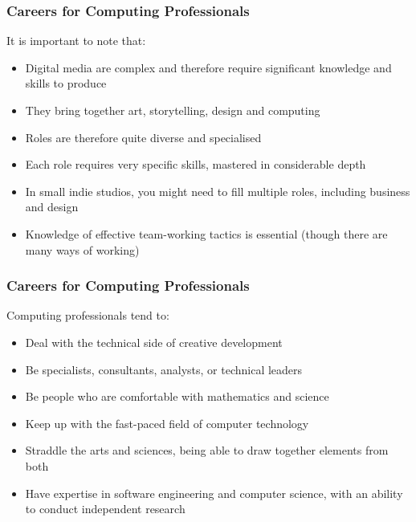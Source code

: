 \begin{frame}
	\frametitle{Careers for Computing Professionals}
	
	It is important to note that:\pause
	
	\begin{itemize}
		\item Digital media are complex and therefore require significant knowledge and skills to produce \pause
		\item They bring together art, storytelling, design and computing \pause
		\item Roles are therefore quite diverse and specialised \pause
		\item Each role requires very specific skills, mastered in considerable depth \pause
		\item In small indie studios, you might need to fill multiple roles, including business and design \pause
		\item Knowledge of effective team-working tactics is essential (though there are many ways of working)
	\end{itemize}
\end{frame}

\begin{frame}
	\frametitle{Careers for Computing Professionals}
	
	Computing professionals tend to:
	
	\begin{itemize}
		\item Deal with the technical side of creative development \pause
		\item Be specialists, consultants, analysts, or technical leaders \pause
		\item Be people who are comfortable with mathematics and science \pause
		\item Keep up with the fast-paced field of computer technology \pause
		\item Straddle the arts and sciences, being able to draw together elements from both \pause
		\item Have expertise in software engineering and computer science, with an ability to conduct independent research
	\end{itemize}
\end{frame}

